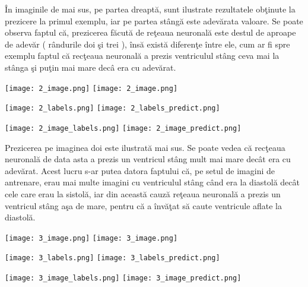 \^{I}n imaginile de mai sus, pe partea dreapt\u{a}, sunt ilustrate rezultatele ob\c{t}inute la prezicere la primul exemplu, iar pe partea st\^{a}ng\u{a} este adev\u{a}rata valoare. Se poate observa faptul c\u{a}, prezicerea f\u{a}cut\u{a} de re\c{t}eaua neuronal\u{a} este destul de aproape de adev\u{a}r ( r\^{a}ndurile doi \c{s}i trei ), \^{i}ns\u{a} exist\u{a} diferen\c{t}e \^{i}ntre ele, cum ar fi spre exemplu faptul c\u{a} rec\c{t}eaua neuronal\u{a} a prezis ventriculul st\^{a}ng ceva mai la st\^{a}nga \c{s}i pu\c{t}in mai mare dec\^{a} era cu adev\u{a}rat.

\begin{center}
\texttt{[image: 2\_image.png]}
\texttt{[image: 2\_image.png]}
\end{center}

\begin{center}
\texttt{[image: 2\_labels.png]}
\texttt{[image: 2\_labels\_predict.png]}
\end{center}

\begin{center}
\texttt{[image: 2\_image\_labels.png]}
\texttt{[image: 2\_image\_predict.png]}
\end{center}

Prezicerea pe imaginea doi este ilustrat\u{a} mai sus. Se poate vedea c\u{a} rec\c{t}eaua neuronal\u{a} de data asta a prezis un ventricul st\^{a}ng mult mai mare dec\^{a}t era cu adev\u{a}rat. Acest lucru s-ar putea datora faptului c\u{a}, pe setul de imagini de antrenare, erau mai multe imagini cu ventriculul st\^{a}ng c\^{a}nd era la diastol\u{a} dec\^{a}t cele care erau la sistol\u{a}, iar din aceast\u{a} cauz\u{a} re\c{t}eaua neuronal\u{a} a prezis un ventricul st\^{a}ng a\c{s}a de mare, pentru c\u{a} a \^{i}nv\u{a}\c{t}at s\u{a} caute ventricule aflate la diastol\u{a}.

\begin{center}
\texttt{[image: 3\_image.png]}
\texttt{[image: 3\_image.png]}
\end{center}

\begin{center}
\texttt{[image: 3\_labels.png]}
\texttt{[image: 3\_labels\_predict.png]}
\end{center}

\begin{center}
\texttt{[image: 3\_image\_labels.png]}
\texttt{[image: 3\_image\_predict.png]}
\end{center}

